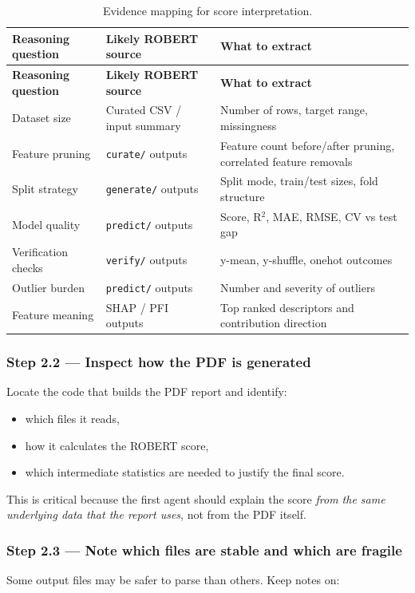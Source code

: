 \documentclass[11pt]{article}
\begin{document}
\begin{longtable}{p{} p{} p{}}
\caption{Evidence mapping for score interpretation.}\label{tab:evidence}\\
\toprule
\textbf{Reasoning question} & \textbf{Likely ROBERT source} & \textbf{What to extract} \\
\midrule
\endfirsthead
\toprule
\textbf{Reasoning question} & \textbf{Likely ROBERT source} & \textbf{What to extract} \\
\midrule
\endhead
Dataset size & Curated CSV / input summary & Number of rows, target range, missingness \\
Feature pruning & \texttt{curate/} outputs & Feature count before/after pruning, correlated feature removals \\
Split strategy & \texttt{generate/} outputs & Split mode, train/test sizes, fold structure \\
Model quality & \texttt{predict/} outputs & Score, R$^2$, MAE, RMSE, CV vs test gap \\
Verification checks & \texttt{verify/} outputs & y-mean, y-shuffle, onehot outcomes \\
Outlier burden & \texttt{predict/} outputs & Number and severity of outliers \\
Feature meaning & SHAP / PFI outputs & Top ranked descriptors and contribution direction \\
\bottomrule
\end{longtable}

\subsubsection*{Step 2.2 --- Inspect how the PDF is generated}
Locate the code that builds the PDF report and identify:

\begin{itemize}
    \item which files it reads,
    \item how it calculates the ROBERT score,
    \item which intermediate statistics are needed to justify the final score.
\end{itemize}

This is critical because the first agent should explain the score \emph{from the same underlying data that the report uses}, not from the PDF itself.

\subsubsection*{Step 2.3 --- Note which files are stable and which are fragile}
Some output files may be safer to parse than others. Keep notes on:
\end{document}
